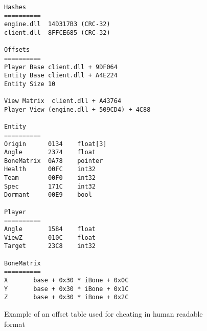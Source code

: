 \begin{figure}
\begin{verbatim}
Hashes
==========
engine.dll	14D317B3 (CRC-32)
client.dll	8FFCE685 (CRC-32)
 
Offsets
==========
Player Base	client.dll + 9DF064
Entity Base	client.dll + A4E224
Entity Size	10
 
View Matrix	 client.dll + A43764
Player View	(engine.dll + 509CD4) + 4C88
 
Entity
==========
Origin		0134	float[3]
Angle		2374	float
BoneMatrix	0A78	pointer
Health		00FC	int32
Team		00F0	int32
Spec		171C	int32
Dormant		00E9	bool
 
Player
==========
Angle		1584	float
ViewZ		010C	float
Target		23C8	int32
 
BoneMatrix
==========
X		base + 0x30 * iBone + 0x0C
Y		base + 0x30 * iBone + 0x1C
Z		base + 0x30 * iBone + 0x2C
\end{verbatim}
\caption{Example of an offset table used for cheating in human readable format \cite{offsets}}
\label{fig:offsets}
\end{figure}